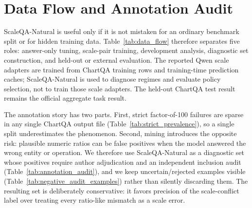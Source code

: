 \section{Data Flow and Annotation Audit}
\label{sec:appendix_data}

ScaleQA-Natural is useful only if it is not mistaken for an ordinary benchmark split or for hidden training data. Table~\ref{tab:data_flow} therefore separates five roles: answer-only tuning, scale-pair training, development analysis, diagnostic set construction, and held-out or external evaluation. The reported Qwen scale adapters are trained from ChartQA training rows and training-time prediction caches; ScaleQA-Natural is used to diagnose regimes and evaluate policy selection, not to train those scale adapters. The held-out ChartQA test result remains the official aggregate task result.

\begin{table}[h]
\centering
\small
\resizebox{\textwidth}{!}{}
\caption{Data flow and split hygiene.}
\label{tab:data_flow}
\end{table}

\begin{table}[h]
\centering
\small
\resizebox{\linewidth}{!}{}
\caption{ScaleQA-Natural source audit. The set is a diagnostic slice mined from multiple model outputs and source rows, not an ordinary training/test split or leaderboard. Occurrence flags are counted over the final 520 positives; source-split rows are counted over the 473 image-evaluable items.}
\label{tab:source_audit}
\end{table}

The annotation story has two parts. First, strict factor-of-100 failures are sparse in any single ChartQA output file (Table~\ref{tab:strict_prevalence}), so a single split underestimates the phenomenon. Second, mining introduces the opposite risk: plausible numeric ratios can be false positives when the model answered the wrong entity or operation. We therefore use ScaleQA-Natural as a diagnostic set whose positives require author adjudication and an independent inclusion audit (Table~\ref{tab:annotation_audit}), and we keep uncertain/rejected examples visible (Table~\ref{tab:negative_audit_examples}) rather than silently discarding them. The resulting set is deliberately conservative: it favors precision of the scale-conflict label over treating every ratio-like mismatch as a scale error.


\begin{table}[h]
\centering
\small
\resizebox{\linewidth}{!}{}
\caption{Strict factor-of-100 scale-error prevalence in available ChartQA validation/test prediction files. These sparse natural subsets motivate the larger ScaleQA-Natural diagnostic set.}
\label{tab:strict_prevalence}
\end{table}

